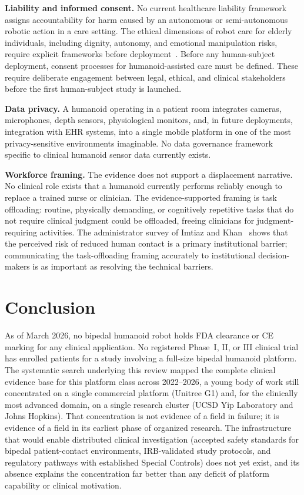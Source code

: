 \documentclass[acmsmall]{acmart}
\begin{document}
\textbf{Liability and informed consent.} No current healthcare liability
framework assigns accountability for harm caused by an autonomous or
semi-autonomous robotic action in a care setting. The ethical dimensions of robot
care for elderly individuals, including dignity, autonomy, and emotional
manipulation risks, require explicit frameworks before
deployment~\cite{sharkey2012granny}. Before any human-subject deployment, consent
processes for humanoid-assisted care must be defined. These require deliberate
engagement between legal, ethical, and clinical stakeholders before the first
human-subject study is launched.

\textbf{Data privacy.} A humanoid operating in a patient room integrates cameras,
microphones, depth sensors, physiological monitors, and, in future deployments,
integration with EHR systems, into a single mobile platform in one of the most
privacy-sensitive environments imaginable. No data governance framework specific
to clinical humanoid sensor data currently exists.

\textbf{Workforce framing.} The evidence does not support a displacement
narrative. No clinical role exists that a humanoid currently performs reliably
enough to replace a trained nurse or clinician. The evidence-supported framing is
task offloading: routine, physically demanding, or cognitively repetitive tasks
that do not require clinical judgment could be offloaded, freeing clinicians for
judgment-requiring activities. The administrator survey of Imtiaz and
Khan~\cite{imtiaz2024perceptions} shows that the perceived risk of reduced human
contact is a primary institutional barrier; communicating the task-offloading
framing accurately to institutional decision-makers is as important as resolving
the technical barriers.

\section{Conclusion}
\label{sec:conclusion}

As of March 2026, no bipedal humanoid robot holds FDA clearance or CE marking for
any clinical application. No registered Phase~I, II, or III clinical trial has
enrolled patients for a study involving a full-size bipedal humanoid platform. The
systematic search underlying this review mapped the complete clinical evidence
base for this platform class across 2022--2026, a young body of work still
concentrated on a
single commercial platform (Unitree G1) and, for the clinically most advanced
domain, on a single research cluster (UCSD Yip Laboratory and Johns Hopkins). That
concentration is not evidence of a field in failure; it is evidence of a field in
its earliest phase of organized research. The infrastructure that would enable
distributed clinical investigation (accepted safety standards for bipedal
patient-contact environments, IRB-validated study protocols, and regulatory
pathways with established Special Controls) does not yet exist, and its absence
explains the concentration far better than any deficit of platform capability or
clinical motivation.
\end{document}
